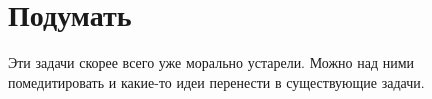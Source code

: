 





\chapter{Подумать} %

Эти задачи скорее всего уже морально устарели. Можно над ними помедитировать
и какие-то идеи перенести в существующие задачи.




